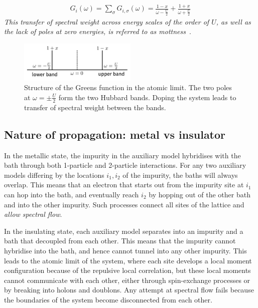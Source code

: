 \documentclass{report}
\numberwithin{equation}{section}
\begin{document}
\begin{equation}\begin{aligned}
	G_{i}(\omega) = \sum_\sigma G_{i,\sigma}(\omega) = \frac{1 - x}{\omega - \frac{U}{2}} + \frac{1 + x}{\omega + \frac{U}{2}}
\end{aligned}\end{equation}
\textit{This transfer of spectral weight across energy scales of the order of \(U\), as well as the lack of poles at zero energies, is referred to as mottness}~\cite{phillips2006mottness}.
\begin{figure}[!htpb]
	\centering
	\includegraphics[width=0.5\textwidth]{../figures/hubbard_bands.pdf}
	\caption{Structure of the Greens function in the atomic limit. The two poles at \(\omega = \pm \frac{U}{2}\) form the two Hubbard bands. Doping the system leads to transfer of spectral weight between the bands.}
\end{figure}

\subsection{Nature of propagation: metal vs insulator}
In the metallic state, the impurity in the auxiliary model hybridises with the bath through both 1-particle and 2-particle interactions. For any two auxiliary models differing by the locations \(i_1, i_2\) of the impurity, the baths will always overlap. This means that an electron that starts out from the impurity site at \(i_1\) can hop into the bath, and eventually reach \(i_2\) by hopping out of the other bath and into the other impurity. Such processes connect all sites of the lattice and \textit{allow spectral flow}.

In the insulating state, each auxiliary model separates into an impurity and a bath that decoupled from each other. This means that the impurity cannot hybridise into the bath, and hence cannot tunnel into any other impurity. This leads to the atomic limit of the system, where each site develops a local moment configuration because of the repulsive local correlation, but these local moments cannot communicate with each other, either through spin-exchange processes or by breaking into holons and doublons. Any attempt at spectral flow fails because the boundaries of the system become disconnected from each other.
\end{document}
